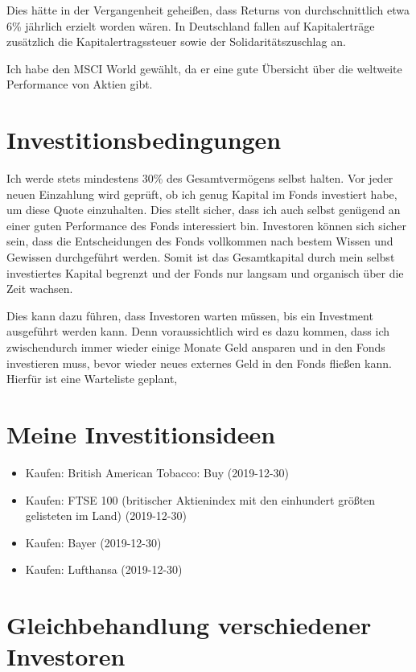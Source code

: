 \documentclass{article}
\begin{document}
Dies hätte in der Vergangenheit geheißen, dass Returns von durchschnittlich etwa 6\% jährlich erzielt worden wären. In Deutschland fallen auf Kapitalerträge zusätzlich die Kapitalertragssteuer sowie der Solidaritätszuschlag an.

Ich habe den MSCI World gewählt, da er eine gute Übersicht über die weltweite Performance von Aktien gibt.

\section{Investitionsbedingungen}

Ich werde stets mindestens 30\% des Gesamtvermögens selbst halten. Vor jeder neuen Einzahlung wird geprüft, ob ich genug Kapital im Fonds investiert habe, um diese Quote einzuhalten. Dies stellt sicher, dass ich auch selbst genügend an einer guten Performance des Fonds interessiert bin. Investoren können sich sicher sein, dass die Entscheidungen des Fonds vollkommen nach bestem Wissen und Gewissen durchgeführt werden. Somit ist das Gesamtkapital durch mein selbst investiertes Kapital begrenzt und der Fonds nur langsam und organisch über die Zeit wachsen.

Dies kann dazu führen, dass Investoren warten müssen, bis ein Investment ausgeführt werden kann. Denn voraussichtlich wird es dazu kommen, dass ich zwischendurch immer wieder einige Monate Geld ansparen und in den Fonds investieren muss, bevor wieder neues externes Geld in den Fonds fließen kann. Hierfür ist eine Warteliste geplant, 

\section{Meine Investitionsideen}

\begin{itemize}
    \item Kaufen: British American Tobacco: Buy (2019-12-30)
    \item Kaufen: FTSE 100 (britischer Aktienindex mit den einhundert größten gelisteten im Land) (2019-12-30)
    \item Kaufen: Bayer (2019-12-30)
    \item Kaufen: Lufthansa (2019-12-30)
\end{itemize}


\section{Gleichbehandlung verschiedener Investoren}
\end{document}
